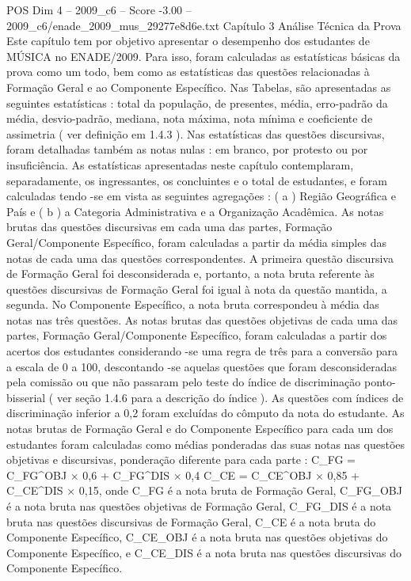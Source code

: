 \begin{textsample}{POS Dim 4 – 2009\_c6 – Score -3.00 – 2009\_c6/enade\_2009\_mus\_29277e8d6e.txt}  \label{ex:f4_pos_328}
Capítulo 3 Análise Técnica da Prova Este capítulo tem por objetivo apresentar o desempenho dos estudantes de MÚSICA no ENADE/2009.
Para isso, foram calculadas as estatísticas básicas da prova como um todo, bem como as estatísticas das questões relacionadas à Formação Geral e ao Componente Específico.
Nas Tabelas, são apresentadas as seguintes estatísticas : total da população, de presentes, média, erro-padrão da média, desvio-padrão, mediana, nota máxima, nota mínima e coeficiente de assimetria ( ver definição em 1.4.3 ).
Nas estatísticas das questões discursivas, foram detalhadas também as notas nulas : em branco, por protesto ou por insuficiência.
As estatísticas apresentadas neste capítulo contemplaram, separadamente, os ingressantes, os concluintes e o total de estudantes, e foram calculadas tendo -se em vista as seguintes agregações : ( a ) Região Geográfica e País e ( b ) a Categoria Administrativa e a Organização Acadêmica.
As notas brutas das questões discursivas em cada uma das partes, Formação Geral/Componente Específico, foram calculadas a partir da média simples das notas de cada uma das questões correspondentes.
A primeira questão discursiva de Formação Geral foi desconsiderada e, portanto, a nota bruta referente às questões discursivas de Formação Geral foi igual à nota da questão mantida, a segunda.
No Componente Específico, a nota bruta correspondeu à média das notas nas três questões.
As notas brutas das questões objetivas de cada uma das partes, Formação Geral/Componente Específico, foram calculadas a partir dos acertos dos estudantes considerando -se uma regra de três para a conversão para a escala de 0 a 100, descontando -se aquelas questões que foram desconsideradas pela comissão ou que não passaram pelo teste do índice de discriminação ponto-bisserial ( ver seção 1.4.6 para a descrição do índice ).
As questões com índices de discriminação inferior a 0,2 foram excluídas do cômputo da nota do estudante.
As notas brutas de Formação Geral e do Componente Específico para cada um dos estudantes foram calculadas como médias ponderadas das suas notas nas questões objetivas e discursivas, ponderação diferente para cada parte : C\_FG = C\_FG\textasciicircum{}OBJ × 0,6 + C\_FG\textasciicircum{}DIS × 0,4 C\_CE = C\_CE\textasciicircum{}OBJ × 0,85 + C\_CE\textasciicircum{}DIS × 0,15, onde C\_FG é a nota bruta de Formação Geral, C\_FG\_OBJ é a nota bruta nas questões objetivas de Formação Geral, C\_FG\_DIS é a nota bruta nas questões discursivas de Formação Geral, C\_CE é a nota bruta do Componente Específico, C\_CE\_OBJ é a nota bruta nas questões objetivas do Componente Específico, e C\_CE\_DIS é a nota bruta nas questões discursivas do Componente Específico.

\end{textsample}
